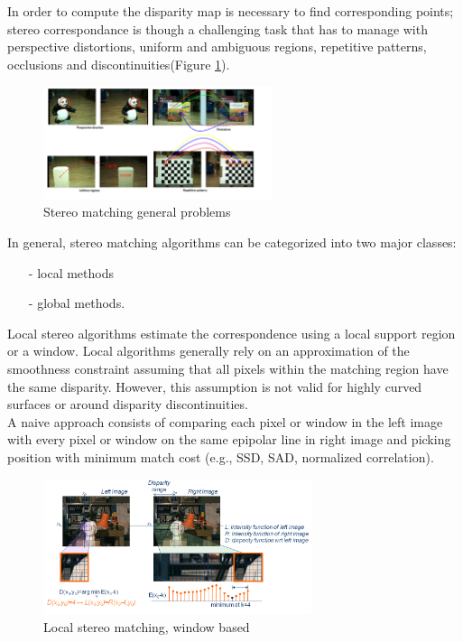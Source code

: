 In order to compute the disparity map is necessary to find corresponding points; stereo correspondance is though a challenging task that has to manage with perspective distortions, uniform and ambiguous regions, repetitive patterns, occlusions and discontinuities(Figure \ref{fig:occl}).\\
\begin{figure}[h!]
\centering
\includegraphics[width=0.6\textwidth]{./img/occl.png}
\caption{\small{Stereo matching general problems}}
\label{fig:occl}
\end{figure}
In general, stereo matching algorithms can be categorized into two major classes:
\begin{itemize}
\item[-] local methods 
\item[-] global methods.
\end{itemize}
Local stereo algorithms estimate the correspondence using a local support region or a window. Local algorithms generally rely on an approximation of the smoothness constraint assuming that all pixels within the matching region have the same disparity. However, this assumption is not valid for highly curved surfaces or around disparity discontinuities.\\
A naive approach consists of comparing each  pixel or window in the left image with every pixel or window on the same epipolar line in right image and picking position with minimum match cost (e.g., SSD, SAD, normalized correlation).\\ 
\begin{figure}[h!]
\centering
\includegraphics[width=0.7\textwidth]{./img/local.png}
\caption{\small{Local stereo matching, window based}}
\label{fig:local}
\end{figure}
